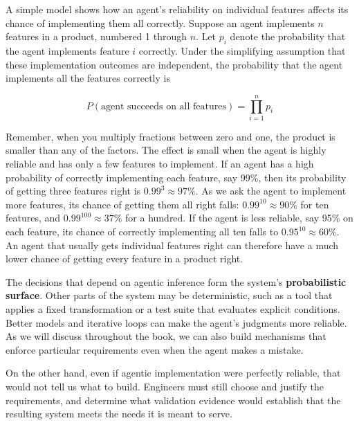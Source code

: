 A simple model shows how an agent's reliability on individual features affects its chance of implementing them all correctly. Suppose an agent implements \(n\) features in a product, numbered 1 through \(n\). Let \(p_i\) denote the probability that the agent implements feature \(i\) correctly. Under the simplifying assumption that these implementation outcomes are independent, the probability that the agent implements all the features correctly is

\[
P(\text{agent succeeds on all features}) = \prod_{i=1}^{n} p_i
\]

Remember, when you multiply fractions between zero and one, the product is smaller than any of the factors. The effect is small when the agent is highly reliable and has only a few features to implement. If an agent has a high probability of correctly implementing each feature, say 99\%, then its probability of getting three features right is \(0.99^3 \approx 97\%\). As we ask the agent to implement more features, its chance of getting them all right falls: \(0.99^{10} \approx 90\%\) for ten features, and \(0.99^{100} \approx 37\%\) for a hundred. If the agent is less reliable, say 95\% on each feature, its chance of correctly implementing all ten falls to \(0.95^{10} \approx 60\%\). An agent that usually gets individual features right can therefore have a much lower chance of getting every feature in a product right.




The decisions that depend on agentic inference form the system's \textbf{probabilistic surface}. Other parts of the system may be deterministic, such as a tool that applies a fixed transformation or a test suite that evaluates explicit conditions. Better models and iterative loops can make the agent's judgments more reliable. As we will discuss throughout the book, we can also build mechanisms that enforce particular requirements even when the agent makes a mistake.

On the other hand, even if agentic implementation were perfectly reliable, that would not tell us what to build. Engineers must still choose and justify the requirements, and determine what validation evidence would establish that the resulting system meets the needs it is meant to serve.
